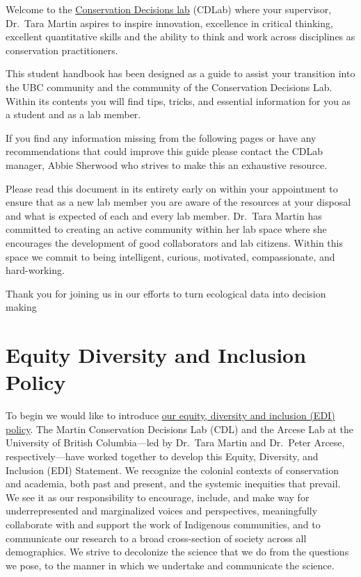 \documentclass[
]{book}
\begin{document}
Welcome to the \href{https://www.taramartin.org/}{Conservation Decisions lab} (CDLab) where your supervisor, Dr.~Tara Martin aspires to inspire innovation, excellence in critical thinking, excellent quantitative skills and the ability to think and work across disciplines as conservation practitioners.

This student handbook has been designed as a guide to assist your transition into the UBC community and the community of the Conservation Decisions Lab. Within its contents you will find tips, tricks, and essential information for you as a student and as a lab member.

If you find any information missing from the following pages or have any recommendations that could improve this guide please contact the CDLab manager, Abbie Sherwood who strives to make this an exhaustive resource.

Please read this document in its entirety early on within your appointment to ensure that as a new lab member you are aware of the resources at your disposal and what is expected of each and every lab member. Dr.~Tara Martin has committed to creating an active community within her lab space where she encourages the development of good collaborators and lab citizens. Within this space we commit to being intelligent, curious, motivated, compassionate, and hard-working.

Thank you for joining us in our efforts to turn ecological data into decision making

\hypertarget{diversity}{%
\chapter*{Equity Diversity and Inclusion Policy}\label{diversity}}

To begin we would like to introduce \href{https://www.taramartin.org/equity-diversity-and-inclusion/}{our equity, diversity and inclusion (EDI) policy}. The Martin Conservation Decisions Lab (CDL) and the Arcese Lab at the University of British Columbia---led by Dr.~Tara Martin and Dr.~Peter Arcese, respectively---have worked together to develop this Equity, Diversity, and Inclusion (EDI) Statement. We recognize the colonial contexts of conservation and academia, both past and present, and the systemic inequities that prevail. We see it as our responsibility to encourage, include, and make way for underrepresented and marginalized voices and perspectives, meaningfully collaborate with and support the work of Indigenous communities, and to communicate our research to a broad cross-section of society across all demographics. We strive to decolonize the science that we do from the questions we pose, to the manner in which we undertake and communicate the science.
\end{document}
